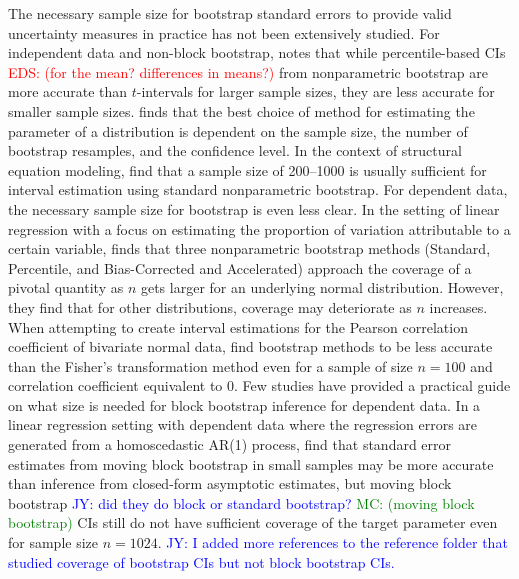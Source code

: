 \documentclass[12pt, letterpaper, titlepage]{article}
\newcommand{\jy}[1]{\textcolor{blue}{JY: #1}}
\newcommand{\eds}[1]{\textcolor{red}{EDS: (#1)}}
\newcommand{\mc}[1]{\textcolor{green}{MC: (#1)}}
\begin{document}
The necessary sample size for bootstrap standard errors to provide valid
uncertainty measures in practice has not been extensively studied. For
independent data and non-block bootstrap, \citet{hesterberg2015teachers} notes
that while percentile-based CIs \eds{for the mean? differences in means?} from 
nonparametric bootstrap
are more accurate than $t$-intervals for larger sample sizes, they are
less accurate for smaller sample sizes. \citet{chernick2009revisiting} finds 
that the best choice of method for estimating
the parameter of a distribution is dependent on the sample size, the number of
bootstrap resamples, and the confidence level. In the context of structural equation
modeling, \citet{nevitt2001performance} find
that a sample size of 200--1000 is usually sufficient for interval estimation
using standard nonparametric bootstrap. For dependent data, the necessary
sample
size for bootstrap is even less clear. In the setting of linear regression with a
focus on estimating the proportion of 
variation attributable to a certain variable, \citet{burch2012nonparametric} finds
that three nonparametric bootstrap methods (Standard, Percentile, and Bias-Corrected
and
Accelerated) approach the coverage of a pivotal quantity as $n$ gets larger for an
underlying normal distribution. However, they find that for other distributions, 
coverage may deteriorate as $n$ increases. 
When attempting to create interval estimations for the Pearson correlation 
coefficient of bivariate normal data, \citet{puth2015variety} find bootstrap 
methods to be less accurate than the Fisher's transformation method even 
for a sample of size $n = 100$ and correlation coefficient equivalent to 0.
Few studies have provided a practical guide on what size is needed
for block bootstrap inference for dependent data.
In a linear regression setting
with
dependent data where the
regression errors are generated from a homoscedastic AR(1) process, 
\citet{goncalves2005bootstrap} find that standard error
estimates from moving 
block bootstrap in small samples may be more accurate than
inference from closed-form asymptotic estimates, but moving block bootstrap 
\jy{did they do block or standard bootstrap?}
\mc{moving block bootstrap}
CIs still do not have sufficient coverage of the target parameter even for sample size
$n = 1024$.
\jy{I added more references to the reference folder that studied coverage of
  bootstrap CIs but not block bootstrap CIs.}
\end{document}
